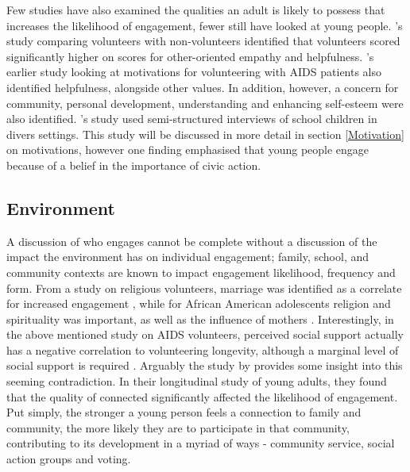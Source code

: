 Few studies have also examined the qualities an adult is likely to possess that increases the likelihood of engagement, fewer still have looked at young people. \citeauthor{Penner2002}'s \citeyear{Penner2002} study comparing volunteers with non-volunteers identified that volunteers scored significantly higher on scores for other-oriented empathy and helpfulness. \citeauthor{Omoto1995}'s earlier \citeyear{Omoto1995} study looking at motivations for volunteering with AIDS patients also identified helpfulness, alongside other values. In addition, however, a concern for community, personal development, understanding and enhancing self-esteem were also identified. \citeauthor{Ballard2014}'s \citeyear{Ballard2014} study used semi-structured interviews of school children in divers settings. This study will be discussed in more detail in section \ref{Motivation} on motivations, however one finding emphasised that young people engage because of a belief in the importance of civic action.



\subsection{Environment}

A discussion of who engages cannot be complete without a discussion of the impact the environment has on individual engagement; family, school, and community contexts are known to impact engagement likelihood, frequency and form. From a study on religious volunteers, marriage was identified as a correlate for increased engagement \citep[]{Garland2008}, while for African American adolescents religion and spirituality was important, as well as the influence of mothers \citep{Smetana2005}. Interestingly, in the above mentioned study on AIDS volunteers, perceived social support actually has a negative correlation to volunteering longevity, although a marginal level of social support is required \citep{Omoto1995}. Arguably the study by \citep{Duke2009} provides some insight into this seeming contradiction. In their longitudinal study of young adults, they found that the quality of connected significantly affected the likelihood of engagement. Put simply, the stronger a young person feels a connection to family and community, the more likely they are to participate in that community, contributing to its development in a myriad of ways - community service, social action groups and voting. 

